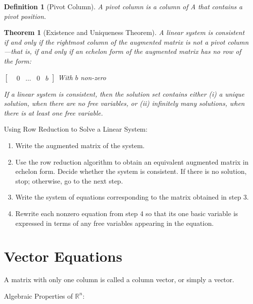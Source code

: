 \documentclass[oneside]{report}
\newtheorem{theorem}{Theorem}[section]
\newtheorem{definition}{Definition}[section]
\begin{document}
\begin{definition}[Pivot Column]
  A pivot column is a column of A that contains
  a pivot position.
\end{definition}

\begin{theorem}[Existence and Uniqueness Theorem]
  A linear system is consistent if and only if the rightmost column of the augmented
  matrix is not a pivot column—that is, if and only if an echelon form of the
  augmented matrix has no row of the form:

  \begin{center}
    $\begin{bmatrix}
      &0 &\dots &0  &b
    \end{bmatrix}$
    With $b$ non-zero
  \end{center}
If a linear system is consistent, then the solution set contains either (i) a unique
  solution, when there are no free variables, or (ii) infinitely many solutions, when
  there is at least one free variable.
\end{theorem}

Using Row Reduction to Solve a Linear System:
\begin{enumerate}
  \item Write the augmented matrix of the system.
  \item Use the row reduction algorithm to obtain an equivalent augmented matrix in echelon form. Decide whether the system is consistent. If there is no solution, stop; otherwise, go to the next step.
  \item Write the system of equations corresponding to the matrix obtained in step 3.
  \item Rewrite each nonzero equation from step 4 so that its one basic variable is expressed in terms of any free variables appearing in the equation.
\end{enumerate}

\section{Vector Equations}

A matrix with only one column is called a column vector, or simply a vector.

Algebraic Properties of $\mathbb{R}^n$:
\end{document}
